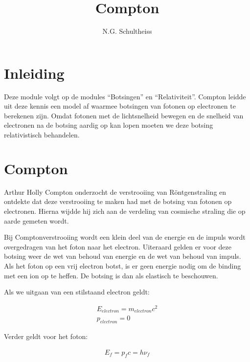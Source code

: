 



\title{Compton}
\author{N.G. Schultheiss}
\date{}

\maketitle
\thispagestyle{firststyle}

\section{Inleiding}

Deze module volgt op de modules ``Botsingen'' en ``Relativiteit''.
Compton leidde uit deze kennis een model af waarmee botsingen van
fotonen op electronen te berekenen zijn. Omdat fotonen met de lichtsnelheid
bewegen en de snelheid van electronen na de botsing aardig op kan
lopen moeten we deze botsing relativistisch behandelen.


\section{Compton}

Arthur Holly Compton onderzocht de verstrooiing van Röntgenstraling
en ontdekte dat deze verstrooiing te maken had met de botsing van
fotonen op electronen. Hierna wijdde hij zich aan de verdeling van
cosmische straling die op aarde gemeten wordt. 

Bij Comptonverstrooiing wordt een klein deel van de energie en de
impuls wordt overgedragen van het foton naar het electron. Uiteraard
gelden er voor deze botsing weer de wet van behoud van energie en
de wet van behoud van impuls. Als het foton op een vrij electron botst,
is er geen energie nodig om de binding met een ion op te heffen. De
botsing is dan als elastisch te beschouwen. 

Als we uitgaan van een stilstaand electron geldt:

\begin{equation} \label{eq:rest}
\begin{array}{c}
E_{electron}=m_{electron}c^{2}\\
p_{electron}=0
\end{array}
\end{equation}


Verder geldt voor het foton:

\begin{equation} \label{eq:foton}
\begin{array}{c}
E_{f}=p_{f}c=h\nu_{f}
\end{array}
\end{equation}


